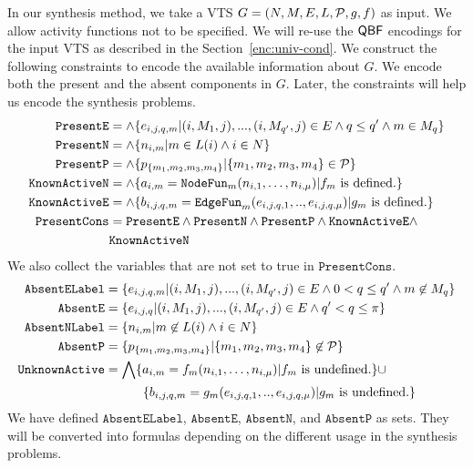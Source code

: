 In our synthesis method, we take a VTS $G =
(N,M,E,L,\mathcal{P},g,f)$ as input.
%
We allow activity functions not to be specified.
%
We will re-use the $\mathsf{QBF}$ encodings for the input VTS as described in the Section~\ref{enc:univ-cond}.
%
We construct the following constraints to encode the available information
about $G$.
%
We encode both the present and the absent components in $G$.
%
Later, the constraints will help us encode the synthesis problems.
%
\begin{align*}
\texttt{PresentE} &= \land \{e_{i,j,q,m}|(i,M_1,j),...,(i,M_{q'},j) \in E \land q \leq q' \land m \in M_q \}\\
\texttt{PresentN} &= \land \{n_{i,m}| m \in L(i) \land i \in N \}\\
\texttt{PresentP} &= \land \{p_{\{m_1,m_2,m_3,m_4\}}| \{m_1,m_2,m_3,m_4\} \in \mathcal{P} \} \\
\texttt{KnownActiveN} &= \land \{ a_{i,m} = \texttt{NodeFun}_m (n_{i,1},\dots,n_{i,\mu}) | f_m \text{ is defined.} \} \\
\texttt{KnownActiveE} &= \land \{ b_{i,j,q,m} = \texttt{EdgeFun}_m(e_{i,j,q,1}, .., e_{i,j,q,\mu})
| g_m \text{ is defined.} \} \\
\texttt{PresentCons} & = \texttt{PresentE} \land \texttt{PresentN} \land 
\texttt{PresentP} \land \texttt{KnownActiveE} \land \\
&  \texttt{KnownActiveN}
\end{align*}
We also collect the variables that are not set to true in $\texttt{PresentCons}$.
\begin{align*}
\texttt{AbsentELabel} &=
\{e_{i,j,q,m}|(i,M_1,j),...,(i,M_{q'},j) \in E \land 
0 < q \leq q' \land m \not\in M_{q} \}\\
\texttt{AbsentE} &= \{e_{i,j,q}|(i,M_1,j),...,(i,M_{q'},j) \in E \land 
q' < q \leq \pi \}\\
\texttt{AbsentNLabel} &= \{n_{i,m}| m \not\in L(i) \land i \in N \}\\
\texttt{AbsentP} &= \{p_{\{m_1,m_2,m_3,m_4\}}| {\{m_1,m_2,m_3,m_4\}} \not\in \mathcal{P} \} \\
\texttt{UnknownActive} &=  \bigwedge \{ a_{i,m} = f_m (n_{i,1},\dots,n_{i,\mu}) | f_m \text{ is undefined.} \} {\cup} \\
&\quad\quad\quad  \{ b_{i,j,q,m} = g_m(e_{i,j,q,1}, .., e_{i,j,q,\mu})
| g_m \text{ is undefined.} \}
\end{align*}
We have defined $\texttt{AbsentELabel}$, $\texttt{AbsentE}$, $\texttt{AbsentN}$, and
$\texttt{AbsentP}$
as sets.
%
They will be converted into formulas depending
on the different usage in the synthesis problems. 
%
